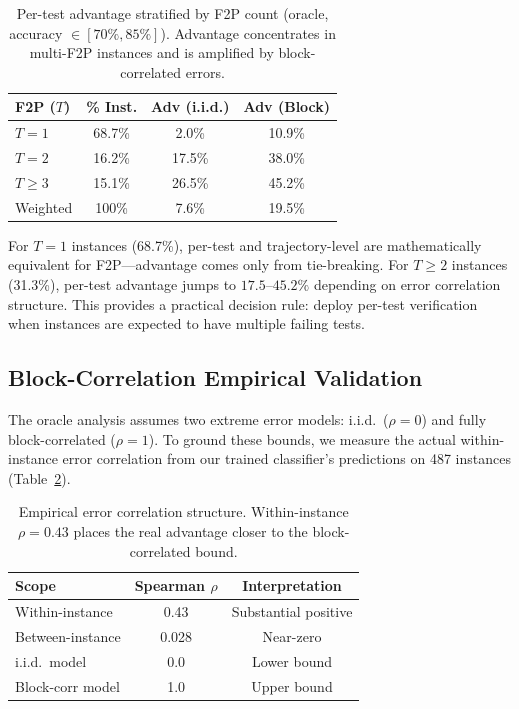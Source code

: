 \documentclass[11pt,a4paper]{article}
\begin{document}
\begin{table}[t]
\centering
\small
\begin{tabular}{lccc}
\toprule
\textbf{F2P ($T$)} & \textbf{\% Inst.} & \textbf{Adv (i.i.d.)} & \textbf{Adv (Block)} \\
\midrule
$T{=}1$ & 68.7\% & 2.0\% & 10.9\% \\
$T{=}2$ & 16.2\% & 17.5\% & 38.0\% \\
$T{\geq}3$ & 15.1\% & 26.5\% & 45.2\% \\
\midrule
Weighted & 100\% & 7.6\% & 19.5\% \\
\bottomrule
\end{tabular}
\caption{Per-test advantage stratified by F2P count (oracle, accuracy $\in [70\%, 85\%]$). Advantage concentrates in multi-F2P instances and is amplified by block-correlated errors.}
\label{tab:oracle-strat}
\end{table}

For $T{=}1$ instances (68.7\%), per-test and trajectory-level are mathematically equivalent for F2P---advantage comes only from tie-breaking.
For $T{\geq}2$ instances (31.3\%), per-test advantage jumps to $17.5$--$45.2\%$ depending on error correlation structure.
This provides a practical decision rule: deploy per-test verification when instances are expected to have multiple failing tests.

\subsection{Block-Correlation Empirical Validation}

The oracle analysis assumes two extreme error models: i.i.d.\ ($\rho{=}0$) and fully block-correlated ($\rho{=}1$).
To ground these bounds, we measure the actual within-instance error correlation from our trained classifier's predictions on 487 instances (Table~\ref{tab:block-corr}).

\begin{table}[t]
\centering
\small
\begin{tabular}{lcc}
\toprule
\textbf{Scope} & \textbf{Spearman $\rho$} & \textbf{Interpretation} \\
\midrule
Within-instance & 0.43 & Substantial positive \\
Between-instance & 0.028 & Near-zero \\
i.i.d.\ model & 0.0 & Lower bound \\
Block-corr model & 1.0 & Upper bound \\
\bottomrule
\end{tabular}
\caption{Empirical error correlation structure. Within-instance $\rho{=}0.43$ places the real advantage closer to the block-correlated bound.}
\label{tab:block-corr}
\end{table}
\end{document}
